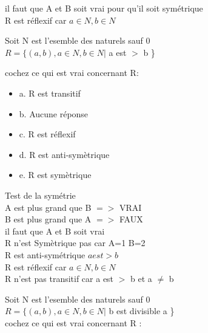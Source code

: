 il faut que A et B soit vrai pour qu'il soit symétrique \\

\vspace{3mm} %
R est réflexif car $a ∈ N, b ∈ N$


\newpage

Soit N est l’esemble des naturels sauf 0 \\
$R=\{(a,b), a ∈ N, b ∈ N |$ a est $>$ b \} \\

\vspace{2mm} %

cochez ce qui est vrai concernant R: \\

\begin{itemize}[label=$\square$]
\item {a. R est transitif}
\item {b. Aucune réponse}
\item {c. R est réflexif}
\item {d. R est anti-symètrique}
\item {e. R est symètrique}
\end{itemize}

\vspace{4mm} %

Test de la symétrie \\

A est plus grand que B $=>$ VRAI \\
B est plus grand que A $=>$ FAUX \\
il faut que A et B soit vrai \\

R n'est Symètrique pas car A=1 B=2 \\
R est anti-symétrique $a est > b$ \\


R est réflexif car $a ∈ N, b ∈ N$ \\
R n'est pas transitif car a est $>$ b  et a $\neq$ b \\


\vspace{10mm} %


Soit N est l’esemble des naturels sauf 0 \\
$R=\{(a,b), a ∈ N, b ∈ N |$ b est divisible a \} \\

cochez ce qui est vrai concernant R : \\


